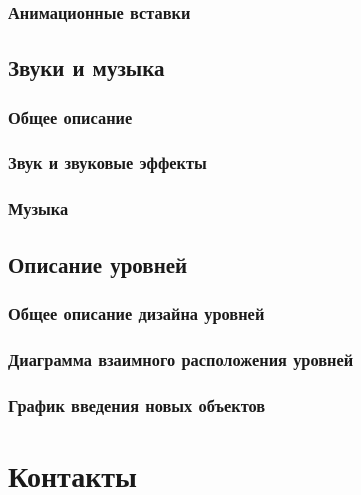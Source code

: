 \documentclass{article}
\begin{document}
\subsubsection{Анимационные вставки}

\subsection{Звуки и музыка}
\subsubsection{Общее описание}
\subsubsection{Звук и звуковые эффекты}
\subsubsection{Музыка}

\subsection{Описание уровней}
\subsubsection{Общее описание дизайна уровней}
\subsubsection{Диаграмма взаимного расположения уровней}
\subsubsection{График введения новых объектов}

\section{Контакты}

\newpage
\end{document}
